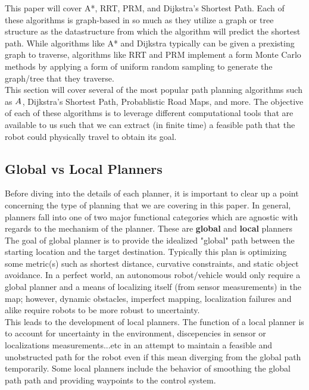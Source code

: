 \documentclass[journal]{IEEEtran}
\begin{document}
This paper will cover A*, RRT, PRM, and Dijkstra's Shortest Path. Each of these algorithms is graph-based in so much as they utilize a graph or tree structure as the datastructure from which the algorithm will predict the shortest path. While algorithms like A* and Dijkstra typically can be given a prexisting graph to traverse, algorithms like RRT and PRM implement a form Monte Carlo methods by applying a form of uniform random sampling to generate the graph/tree that they traverse. \\ 

This section will cover several of the most popular path planning algorithms such as $A^{\*}$, Dijkstra's Shortest Path, Probablistic Road Maps, and more. The objective of each of these algorithms is to leverage different computational tools that are available to us such that we can extract (in finite time) a feasible path that the robot could physically travel to obtain its goal.


\subsection{Global vs Local Planners}

Before diving into the details of each planner, it is important to clear up a point concerning the type of planning that we are covering in this paper. In general, planners fall into one of two major functional categories which are agnostic with regards to the mechanism of the planner. These are \textbf{global} and \textbf{local} planners \\ 

The goal of global planner is to provide the idealized "global" path between the starting location and the target destination. Typically this plan is optimizing some metric(s) such as shortest distance, curvative constraints, and static object avoidance. In a perfect world, an autonomous robot/vehicle would only require a global planner and a means of localizing itself (from sensor measurements) in the map; however, dynamic obstacles, imperfect mapping, localization failures and alike require robots to be more robust to uncertainty. \\

This leads to the development of local planners. The function of a local planner is to account for uncertainty in the environment, discepencies in sensor or localizations measurements...etc in an attempt to maintain a feasible and unobstructed path for the robot even if this mean diverging from the global path temporarily. Some local planners include the behavior of smoothing the global path path and providing waypoints to the control system. \\
\end{document}

